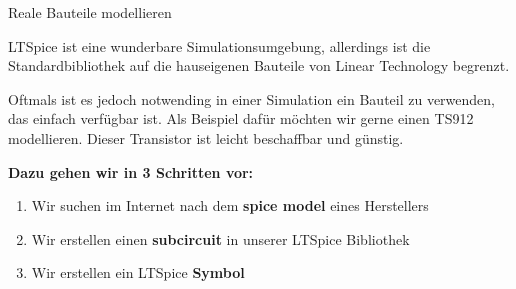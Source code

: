 \begin{frame}[t]{Reale Bauteile modellieren} 

    LTSpice ist eine wunderbare Simulationsumgebung, allerdings ist die Standardbibliothek
    auf die hauseigenen Bauteile von Linear Technology begrenzt.

    Oftmals ist es jedoch notwending in einer Simulation ein Bauteil zu verwenden, 
    das einfach verfügbar ist. Als Beispiel dafür möchten wir gerne einen TS912 modellieren.
    Dieser Transistor ist leicht beschaffbar und günstig.

    \textbf{Dazu gehen wir in 3 Schritten vor:}

    \begin{enumerate}
        \item Wir suchen im Internet nach dem \textbf{spice model} eines Herstellers
        \item Wir erstellen einen \textbf{subcircuit} in unserer LTSpice Bibliothek
        \item Wir erstellen ein LTSpice \textbf{Symbol} 
    \end{enumerate}
\end{frame}

